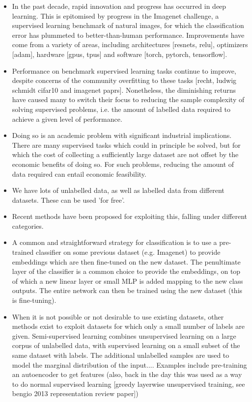\begin{itemize}
	\item In the past decade, rapid innovation and progress has occurred in deep learning. This is epitomised by progress in the Imagenet challenge, a supervised learning benchmark of natural images, for which the classification error has plummeted to better-than-human performance. Improvements have come from a variety of areas, including architectures [resnets, relu], optimizers [adam], hardware [gpus, tpus] and software [torch, pytorch, tensorflow]. 
	\item Performance on benchmark supervised learning tasks continue to improve, despite concerns of the community overfitting to these tasks [recht, ludwig schmidt cifar10 and imagenet paprs]. Nonetheless, the diminishing returns have caused many to switch their focus to reducing the sample complexity of solving supervised problems, i.e. the amount of labelled data required to achieve a given level of performance.
	\item Doing so is an academic problem with significant industrial implications. There are many supervised tasks which could in principle be solved, but for which the cost of collecting a sufficiently large dataset are not offset by the economic benefits of doing so. For such problems, reducing the amount of data required can entail economic feasibility.
	\item We have lots of unlabelled data, as well as labelled data from different datasets. These can be used 'for free'. 
	\item Recent methods have been proposed for exploiting this, falling under different categories. 
	\item A common and straightforward strategy for classification is to use a pre-trained classifier on some previous dataset (e.g. Imagenet) to provide embeddings which are then fine-tuned on the new dataset. The penultimate layer of the classifier is a common choice to provide the embeddings, on top of which a new linear layer or small MLP is added mapping to the new class outputs. The entire network can then be trained using the new dataset (this is fine-tuning). 
	\item When it is not possible or not desirable to use existing datasets, other methods exist to exploit datasets for which only a small number of labels are given. Semi-supervised learning combines unsupervised learning on a large corpus of unlabelled data, with supervised learning on a small subset of the same dataset with labels. The additional unlabelled samples are used to model the marginal distribution of the input.... Examples include pre-training an autoencoder to get features (also, back in the day this was used as a way to do normal supervised learning [greedy layerwise unsupervised training, see bengio 2013 representation review paper])

\end{itemize}
